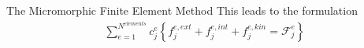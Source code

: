 \documentclass[11pt]{beamer}
\newcommand{\VEC}[1]{\utilde{#1}}
\newcommand\defeq{\mathrel{\stackrel{\makebox[0pt]{\mbox{\normalfont\tiny def}}}{=}}}
\begin{document}
%
%
%
%
%
%
%
%
%
%
%
\begin{frame}{The Micromorphic Finite Element Method}
This leads to the formulation
\begin{align*}
\sum_{e=1}^{N^{elements}} c_j^e\left\{f_{j}^{e,ext} + f_{j}^{e,int} + f_{j}^{e,kin} = \mathcal{F}_j^{e}\right\}
\end{align*}

\end{frame}
\end{document}
